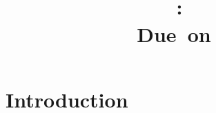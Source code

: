 \documentclass{article}
\title{
    \vspace{2in}
    \textmd{\textbf{\hmwkClass}}\\
    \textmd{\textbf{\hmwkID: \hmwkTitle}} \\
    \normalsize\vspace{0.1in}\small{Due\ on\ \hmwkDueDate}\\
    \vspace{3in}
}
\author{\textbf{\hmwkAuthorName}}
\date{} %
\begin{document}
\maketitle
\newpage

\section{Introduction}
\end{document}
